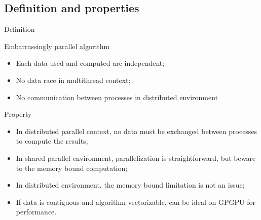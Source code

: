 \documentclass[compress,10pt,aspectratio=169]{beamer}
\begin{document}
\subsection{Definition and properties}
\begin{frame}[fragile]{Definition}
    \scriptsize
    \begin{block}{Embarrassingly parallel algorithm}
        \begin{itemize}
            \item Each data used and computed are independent;
            \item No data race in multithread context;
            \item No communication between processes in distributed environment
        \end{itemize}
    \end{block}

    \begin{exampleblock}{Property}
        \begin{itemize}
            \item In distributed parallel context, no data must be exchanged between processes to compute the results;
            \item In shared parallel environment, parallelization is straightforward, but beware to the memory bound computation;
            \item In distributed environment, the memory bound limitation is not an issue;
            \item If data is contiguous and algorithm vectorizable, can be ideal on GPGPU for performance.
        \end{itemize}
    \end{exampleblock}
\end{frame}
\end{document}

